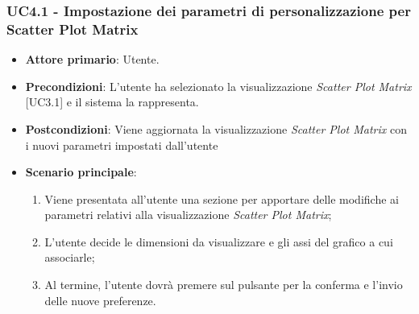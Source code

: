 \subsubsection{UC4.1 - Impostazione dei parametri di personalizzazione per Scatter Plot Matrix}
\begin{itemize}
	\item \textbf{Attore primario}: Utente.
	\item \textbf{Precondizioni}: L'utente ha selezionato la visualizzazione \textit{Scatter Plot Matrix} [UC3.1] e il sistema la rappresenta.
	\item \textbf{Postcondizioni}: Viene aggiornata la visualizzazione \textit{Scatter Plot Matrix} con i nuovi parametri impostati dall'utente
	\item \textbf{Scenario principale}:
	\begin{enumerate}
			\item Viene presentata all'utente una sezione per apportare delle modifiche ai parametri relativi alla visualizzazione \textit{Scatter Plot Matrix};
			\item L'utente decide le dimensioni da visualizzare e gli assi del grafico a cui associarle;
			\item Al termine, l'utente dovrà premere sul pulsante per la conferma e l'invio delle nuove preferenze.
		\end{enumerate}
\end{itemize}